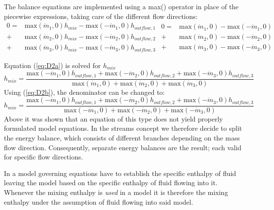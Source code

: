 The balance equations are implemented using a max() operator in place of
the piecewise expressions, taking care of the different flow directions:
\begin{subequations}
\begin{equation}
\begin{split}
0=&\text{max}(\dot{m}_1,0)h_{mix}-\text{max}(-\dot{m}_1,0)h_{outflow,1}\\
+&\text{max}(\dot{m}_2,0)h_{mix}-\text{max}(-\dot{m}_2,0)h_{outflow,2}\\
+&\text{max}(\dot{m}_3,0)h_{mix}-\text{max}(-\dot{m}_3,0)h_{outflow,3}
\end{split}
\label{eq:D2a}
\end{equation}

\begin{equation}
\begin{split}
0=&\text{max}(\dot{m}_1,0)-\text{max}(-\dot{m}_1,0)\\
+&\text{max}(\dot{m}_2,0)-\text{max}(-\dot{m}_2,0)\\
+&\text{max}(\dot{m}_3,0)-\text{max}(-\dot{m}_3,0)
\end{split}
\label{eq:D2b}
\end{equation}
\label{eq:D2}
\end{subequations}

Equation (\ref{eq:D2a}) is solved for $h_{mix}$
\begin{equation*}
h_{mix}=\frac{\text{max}(-\dot{m}_1,0)h_{outflow,1}+\text{max}(-\dot{m}_2,0)h_{outflow,2}+\text{max}(-\dot{m}_3,0)h_{outflow,3}}
{\text{max}(\dot{m}_1,0)+\text{max}(\dot{m}_2,0)+\text{max}(\dot{m}_3,0)}
\end{equation*}
Using (\ref{eq:D2b}), the denominator can be changed to:
\begin{equation*}
h_{mix}=\frac{\text{max}(-\dot{m}_1,0)h_{outflow,1}+\text{max}(-\dot{m}_2,0)h_{outflow,2}+\text{max}(-\dot{m}_3,0)h_{outflow,3}}
{\text{max}(-\dot{m}_1,0)+\text{max}(-\dot{m}_2,0)+\text{max}(-\dot{m}_3,0)}
\end{equation*}
Above it was shown that an equation of this type does not yield properly
formulated model equations. In the streams concept we therefore decide
to split the energy balance, which consists of different branches
depending on the mass flow direction. Consequently, separate energy
balances are the result; each valid for specific flow directions.

In a model governing equations have to establish the specific enthalpy
of fluid leaving the model based on the specific enthalpy of fluid
flowing into it. Whenever the mixing enthalpy is \emph{used} in a model
it is therefore the mixing enthalpy under the assumption of fluid
flowing into said model.

